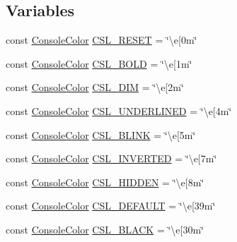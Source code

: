 \subsection*{Variables}
\begin{DoxyCompactItemize}
\item 
const \mbox{\hyperlink{namespaceo_a_a747e07c1977a29f3e1d38683043ec927}{Console\+Color}} \mbox{\hyperlink{namespaceo_a_aac7099bbaefc25658bb46b9b3fa82c2d}{C\+S\+L\+\_\+\+R\+E\+S\+ET}} = \char`\"{}\textbackslash{}e\mbox{[}0m\char`\"{}
\item 
const \mbox{\hyperlink{namespaceo_a_a747e07c1977a29f3e1d38683043ec927}{Console\+Color}} \mbox{\hyperlink{namespaceo_a_a2d820505b86621ebe6932ecc809683ac}{C\+S\+L\+\_\+\+B\+O\+LD}} = \char`\"{}\textbackslash{}e\mbox{[}1m\char`\"{}
\item 
const \mbox{\hyperlink{namespaceo_a_a747e07c1977a29f3e1d38683043ec927}{Console\+Color}} \mbox{\hyperlink{namespaceo_a_ab7f05aa3e8a841f56338991040873345}{C\+S\+L\+\_\+\+D\+IM}} = \char`\"{}\textbackslash{}e\mbox{[}2m\char`\"{}
\item 
const \mbox{\hyperlink{namespaceo_a_a747e07c1977a29f3e1d38683043ec927}{Console\+Color}} \mbox{\hyperlink{namespaceo_a_a04b311941fb36f55f96d366c3cd73152}{C\+S\+L\+\_\+\+U\+N\+D\+E\+R\+L\+I\+N\+ED}} = \char`\"{}\textbackslash{}e\mbox{[}4m\char`\"{}
\item 
const \mbox{\hyperlink{namespaceo_a_a747e07c1977a29f3e1d38683043ec927}{Console\+Color}} \mbox{\hyperlink{namespaceo_a_a89f85b13be9ca3659a9a7b146f14ae3d}{C\+S\+L\+\_\+\+B\+L\+I\+NK}} = \char`\"{}\textbackslash{}e\mbox{[}5m\char`\"{}
\item 
const \mbox{\hyperlink{namespaceo_a_a747e07c1977a29f3e1d38683043ec927}{Console\+Color}} \mbox{\hyperlink{namespaceo_a_a0b06f331fe257aad2fb3c17ac355ad5a}{C\+S\+L\+\_\+\+I\+N\+V\+E\+R\+T\+ED}} = \char`\"{}\textbackslash{}e\mbox{[}7m\char`\"{}
\item 
const \mbox{\hyperlink{namespaceo_a_a747e07c1977a29f3e1d38683043ec927}{Console\+Color}} \mbox{\hyperlink{namespaceo_a_aeedd16fbd49f73cbbb833629970307e4}{C\+S\+L\+\_\+\+H\+I\+D\+D\+EN}} = \char`\"{}\textbackslash{}e\mbox{[}8m\char`\"{}
\item 
const \mbox{\hyperlink{namespaceo_a_a747e07c1977a29f3e1d38683043ec927}{Console\+Color}} \mbox{\hyperlink{namespaceo_a_aadeb6b59aa5701c44f9011d3e313851f}{C\+S\+L\+\_\+\+D\+E\+F\+A\+U\+LT}} = \char`\"{}\textbackslash{}e\mbox{[}39m\char`\"{}
\item 
const \mbox{\hyperlink{namespaceo_a_a747e07c1977a29f3e1d38683043ec927}{Console\+Color}} \mbox{\hyperlink{namespaceo_a_a2963608f327b6bccb71efd831a8315e2}{C\+S\+L\+\_\+\+B\+L\+A\+CK}} = \char`\"{}\textbackslash{}e\mbox{[}30m\char`\"{}

\end{DoxyCompactItemize}
